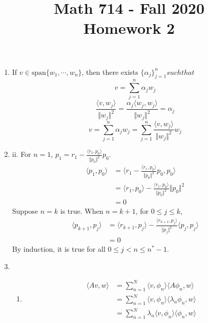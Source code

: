 \documentclass{article}
\title{Math 714 - Fall 2020\\
        {\Large \textbf{Homework 2}}
    }
\date{}
\numberwithin{equation}{section}
\begin{document}
    \maketitle
    \section{}
    \begin{enumerate}[label=(\alph*)]
        \item If $v\in \text{span}\{w_1,\cdots, w_n\}$, then there exists $\{\alpha_j\}_{j=1}^n such that $$$v = \sum_{j=1}^{n} \alpha_j w_j$$
        $$\frac{\langle v, w_j\rangle}{\Vert w_j \Vert^2} = \frac{\alpha_j \langle w_j, w_j \rangle}{\Vert w_j \Vert^2} = \alpha_j$$
        $$v = \sum_{j=1}^n \alpha_j w_j = \sum_{j=1}^n \frac{\langle v, w_j\rangle}{\Vert w_j \Vert^2}w_j$$
        \item ii. For $n=1$, $p_1 = r_1 - \frac{\langle r_1,p_0 \rangle}{\Vert p_0\Vert^2}p_0$.
        \begin{align*}
            \langle p_1, p_0 \rangle
            & = \langle r_1 - \frac{\langle r_1,p_0 \rangle}{\Vert p_0\Vert^2}p_0, p_0 \rangle\\
            & = \langle r_1, p_0 \rangle - \frac{\langle r_1,p_0 \rangle}{\Vert p_0\Vert^2}\Vert p_0\Vert^2\\
            & = 0
        \end{align*}
        Suppose $n=k$ is true. When $n = k+1$, for $0 \leqslant j \leqslant k$,
        \begin{align*}
            \langle p_{k+1}, p_j \rangle
            & = \langle r_{k+1}, p_j \rangle - \frac{\langle r_{k+1}, p_j \rangle}{\Vert p_j \Vert^2} \langle p_j, p_j \rangle\\
            & = 0
        \end{align*}
        By induction, it is true for all $0 \leqslant j < n \leqslant n^*-1$.
        \item \begin{enumerate}[label=\roman*]
            \item \begin{align*}
                \langle Av, w \rangle
                & = \sum_{n=1}^N \langle v, \phi_n \rangle \langle A\phi_n, w \rangle\\
                & = \sum_{n=1}^N \langle v, \phi_n \rangle \langle \lambda_n\phi_n, w \rangle\\
                & = \sum_{n=1}^N \lambda_n\langle v, \phi_n \rangle \langle \phi_n, w \rangle

\end{align*}
\end{enumerate}
\end{enumerate}
\end{document}
